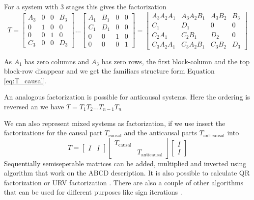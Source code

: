 \documentclass[doctype=mastersthesis,BCOR=15mm,biblatex]{ldvbook}%
\newcommand{\eye}{I} %
\begin{document}
For a system with 3 stages this gives the factorization
\begin{equation*}
	T=
	\left[\begin{matrix}A_{3} & 0 & 0 & B_{3}\\0 & 1 & 0 & 0\\0 & 0 & 1 & 0\\C_{3} & 0 & 0 & D_{3}\end{matrix}\right]
\dots
	\left[\begin{matrix}A_{1} & B_{1} & 0 & 0\\C_{1} & D_{1} & 0 & 0\\0 & 0 & 1 & 0\\0 & 0 & 0 & 1\end{matrix}\right]
	=
	\left[\begin{matrix}A_{3} A_{2} A_{1} & A_{3} A_{2} B_{1} & A_{3} B_{2} & B_{3}\\C_{1} & D_{1} & 0 & 0\\C_{2} A_{1} & C_{2} B_{1} & D_{2} & 0\\C_{3} A_{2} A_{1} & C_{3} A_{2} B_{1} & C_{3} B_{2} & D_{3}\end{matrix}\right]
\end{equation*}

As $A_1$ has zero columns and $A_3$ has zero rows, the first block-column and the top block-row disappear and we get the familiars structure form Equation\,\ref{eq:T_causal}.

An analogous factorization is possible for anticausal systems.
Here the ordering is reversed an we have $T = T_1 T_2 \dots T_{n-1} T_{n}$

We can also represent mixed systems as factorization, if we use insert the factorizations for the causal part $T_{\text{causal}}$ and the anticausal parts $T_{\text{anticausal}}$ into
\begin{equation}
	T = 
	\begin{bmatrix}
	\eye &
	\eye
	\end{bmatrix}
	\begin{bmatrix}
	T_{\text{causal}}&\\
	&T_{\text{anticausal}}
	\end{bmatrix}	
	\begin{bmatrix}
	\eye\\
	\eye
	\end{bmatrix}
\end{equation}
Sequentially semiseperable matrices can be added, multiplied and inverted using algorithm that work on the ABCD description.
It is also possible to calculate QR factorization \cite{chandrasekaran_fast_2002,tong_blind_2003} or URV factorization \cite{chandrasekaran_fast_2005}. 
There are also a couple of other algorithms that can be used for different purposes like sign iterations \cite{rice_efficient_2010}.
\end{document}
